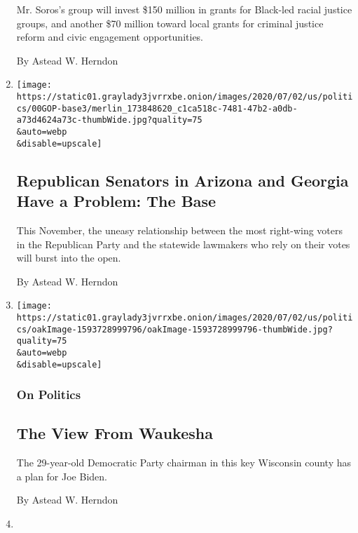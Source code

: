 \begin{enumerate}
  Mr. Soros's group will invest \$150 million in grants for Black-led
  racial justice groups, and another \$70 million toward local grants
  for criminal justice reform and civic engagement opportunities.

  By Astead W. Herndon
\item
  \href{/2020/07/09/us/politics/kelly-loeffler-georgia-senate-arizona.html}{}

  \texttt{[image: https://static01.graylady3jvrrxbe.onion/images/2020/07/02/us/politics/00GOP-base3/merlin\_173848620\_c1ca518c-7481-47b2-a0db-a73d4624a73c-thumbWide.jpg?quality=75\\\&auto=webp\\\&disable=upscale]}

  \hypertarget{republican-senators-in-arizona-and-georgia-have-a-problem-the-base}{%
  \subsection{Republican Senators in Arizona and Georgia Have a Problem:
  The
  Base}\label{republican-senators-in-arizona-and-georgia-have-a-problem-the-base}}

  This November, the uneasy relationship between the most right-wing
  voters in the Republican Party and the statewide lawmakers who rely on
  their votes will burst into the open.

  By Astead W. Herndon
\item
  \href{/2020/07/02/us/politics/waukesha-wisconsin-biden-trump.html}{}

  \texttt{[image: https://static01.graylady3jvrrxbe.onion/images/2020/07/02/us/politics/oakImage-1593728999796/oakImage-1593728999796-thumbWide.jpg?quality=75\\\&auto=webp\\\&disable=upscale]}

  \hypertarget{on-politics}{%
  \subsubsection{On Politics}\label{on-politics}}

  \hypertarget{the-view-from-waukesha}{%
  \subsection{The View From Waukesha}\label{the-view-from-waukesha}}

  The 29-year-old Democratic Party chairman in this key Wisconsin county
  has a plan for Joe Biden.

  By Astead W. Herndon
\item
  \href{/2020/06/27/us/politics/trump-biden-protests-polling.html}{}


\end{enumerate}
